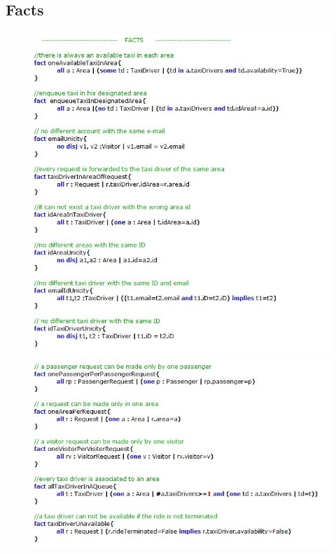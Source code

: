 \documentclass[18pt,oneside,a4paper, titlepage]{article}
\begin{document}
	\subsection{Facts}
	\begin{figure}[h]
		\includegraphics[scale=0.56]{facts1.jpg}%
		\qquad\qquad
		\includegraphics[scale=0.56]{facts2.jpg}
	\end{figure}
\newpage
\end{document}
